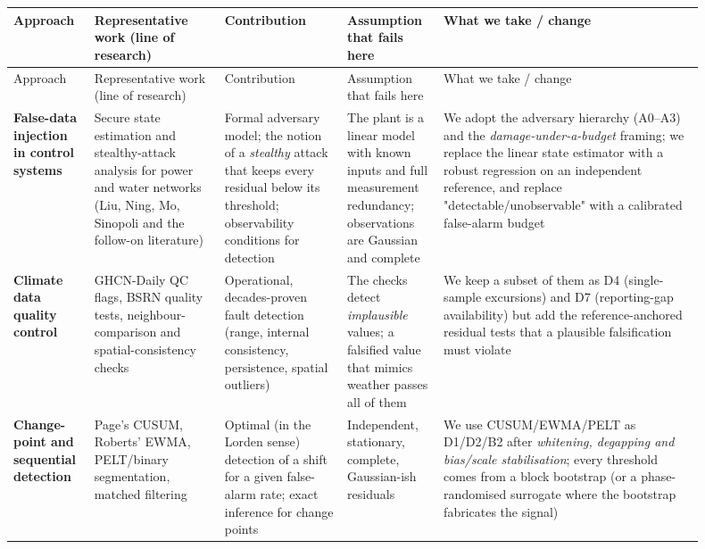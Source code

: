 \documentclass[10pt,a4paper]{article}
\begin{document}
{\small
\setlength{\tabcolsep}{4.5pt}
\setlength{\LTleft}{\fill}
\setlength{\LTright}{\fill}
\begin{longtable}{>{\raggedright\arraybackslash}p{0.081\linewidth}>{\raggedright\arraybackslash}p{0.178\linewidth}>{\raggedright\arraybackslash}p{0.162\linewidth}>{\raggedright\arraybackslash}p{0.128\linewidth}>{\raggedright\arraybackslash}p{0.348\linewidth}}
\toprule
Approach & Representative work (line of research) & Contribution & Assumption that fails here & What we take /\allowbreak{} change \\
\midrule
\endfirsthead
\toprule
Approach & Representative work (line of research) & Contribution & Assumption that fails here & What we take /\allowbreak{} change \\
\midrule
\endhead
\bottomrule
\endlastfoot
\textbf{False-\allowbreak{}data injection in control systems} & Secure state estimation and stealthy-\allowbreak{}attack analysis for power and water networks (Liu, Ning, Mo, Sinopoli and the follow-\allowbreak{}on literature) & Formal adversary model; the notion of a \emph{stealthy} attack that keeps every residual below its threshold; observability conditions for detection & The plant is a linear model with known inputs and full measurement redundancy; observations are Gaussian and complete & We adopt the adversary hierarchy (A0–A3) and the \emph{damage-\allowbreak{}under-\allowbreak{}a-\allowbreak{}budget} framing; we replace the linear state estimator with a robust regression on an independent reference, and replace "detectable/\allowbreak{}unobservable" with a calibrated false-\allowbreak{}alarm budget \\
\textbf{Climate data quality control} & GHCN-\allowbreak{}Daily QC flags, BSRN quality tests, neighbour-\allowbreak{}comparison and spatial-\allowbreak{}consistency checks & Operational, decades-\allowbreak{}proven fault detection (range, internal consistency, persistence, spatial outliers) & The checks detect \emph{implausible} values; a falsified value that mimics weather passes all of them & We keep a subset of them as D4 (single-\allowbreak{}sample excursions) and D7 (reporting-\allowbreak{}gap availability) but add the reference-\allowbreak{}anchored residual tests that a plausible falsification must violate \\
\textbf{Change-\allowbreak{}point and sequential detection} & Page's CUSUM, Roberts' EWMA, PELT/\allowbreak{}binary segmentation, matched filtering & Optimal (in the Lorden sense) detection of a shift for a given false-\allowbreak{}alarm rate; exact inference for change points & Independent, stationary, complete, Gaussian-\allowbreak{}ish residuals & We use CUSUM/\allowbreak{}EWMA/\allowbreak{}PELT as D1/\allowbreak{}D2/\allowbreak{}B2 after \emph{whitening, degapping and bias/\allowbreak{}scale stabilisation}; every threshold comes from a block bootstrap (or a phase-\allowbreak{}randomised surrogate where the bootstrap fabricates the signal) \\

\end{longtable}}
\end{document}
